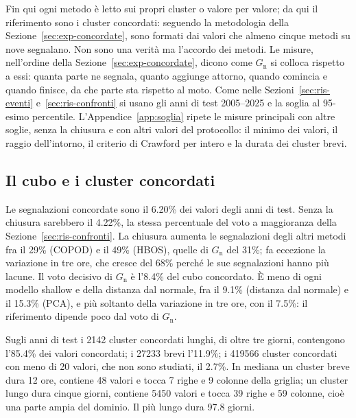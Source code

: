 Fin qui ogni metodo è letto sui propri cluster o valore per valore; da qui il riferimento sono i cluster concordati: seguendo la metodologia della Sezione~\ref{sec:exp-concordate}, sono formati dai valori che almeno cinque metodi su nove segnalano. Non sono una verità ma l'accordo dei metodi. Le misure, nell'ordine della Sezione~\ref{sec:exp-concordate}, dicono come $G_{\mathrm{n}}$ si colloca rispetto a essi: quanta parte ne segnala, quanto aggiunge attorno, quando comincia e quando finisce, da che parte sta rispetto al moto. Come nelle Sezioni~\ref{sec:ris-eventi} e~\ref{sec:ris-confronti} si usano gli anni di test 2005--2025 e la soglia al 95-esimo percentile. L'Appendice~\ref{app:soglia} ripete le misure principali con altre soglie, senza la chiusura e con altri valori del protocollo: il minimo dei valori, il raggio dell'intorno, il criterio di Crawford per intero e la durata dei cluster brevi.

\subsection{Il cubo e i cluster concordati}
\label{sec:ris-concordate-cubo}

Le segnalazioni concordate sono il 6.20\% dei valori degli anni di test. Senza la chiusura sarebbero il 4.22\%, la stessa percentuale del voto a maggioranza della Sezione~\ref{sec:ris-confronti}. La chiusura aumenta le segnalazioni degli altri metodi fra il 29\% (COPOD) e il 49\% (HBOS), quelle di $G_{\mathrm{n}}$ del 31\%; fa eccezione la variazione in tre ore, che cresce del 68\% perché le sue segnalazioni hanno più lacune. Il voto decisivo di $G_{\mathrm{n}}$ è l'8.4\% del cubo concordato. È meno di ogni modello shallow e della distanza dal normale, fra il 9.1\% (distanza dal normale) e il 15.3\% (PCA), e più soltanto della variazione in tre ore, con il 7.5\%: il riferimento dipende poco dal voto di $G_{\mathrm{n}}$.

Sugli anni di test i 2142 cluster concordati lunghi, di oltre tre giorni, contengono l'85.4\% dei valori concordati; i 27233 brevi l'11.9\%; i 419566 cluster concordati con meno di 20 valori, che non sono studiati, il 2.7\%. In mediana un cluster breve dura 12 ore, contiene 48 valori e tocca 7 righe e 9 colonne della griglia; un cluster lungo dura cinque giorni, contiene 5450 valori e tocca 39 righe e 59 colonne, cioè una parte ampia del dominio. Il più lungo dura 97.8 giorni.

